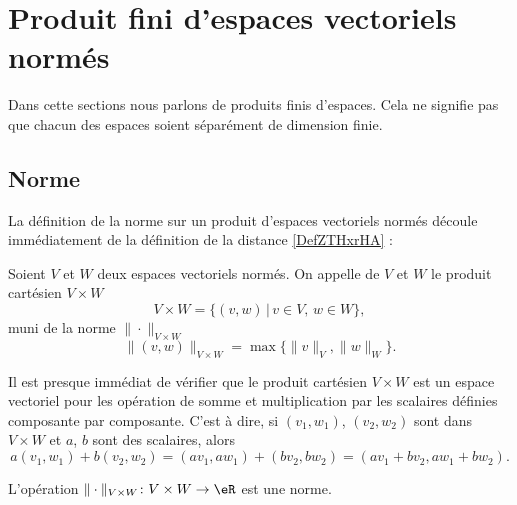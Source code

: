 \section{Produit fini d'espaces vectoriels normés}\label{sec_prod}

Dans cette sections nous parlons de produits finis d'espaces. Cela ne signifie pas que chacun des espaces soient séparément de dimension finie.

\subsection{Norme}

La définition de la norme sur un produit d'espaces vectoriels normés découle immédiatement de la définition de la distance \ref{DefZTHxrHA} :
\begin{definition}  \label{DefFAJgTCE}
    Soient $V$ et $W$ deux espaces vectoriels normés. On appelle  de $V$ et $W$ le produit cartésien $V\times W$ 
    \begin{equation}
    V\times W=\{(v,w)\,|\, v\in V,\, w\in W\},
    \end{equation}
    muni de la norme $\|\cdot \|_{V\times W}$
    \begin{equation}	\label{EqNormeVxWmax}
        \|(v,w) \|_{V\times W}=\max\{\|v\|_{V},\|w\|_W\}.
    \end{equation}
\end{definition}
Il est presque immédiat de vérifier que le produit cartésien $V\times W$ est un espace vectoriel pour les opération de somme et multiplication par les scalaires définies composante par composante. C'est à dire,  si $(v_1,w_1)$, $(v_2,w_2)$ sont dans $V\times W$ et $a$, $b$ sont des scalaires, alors  
\begin{equation}
 a (v_1,w_1)+ b(v_2,w_2)=(av_1,aw_1)+ (bv_2,bw_2)=(av_1+bv_2,aw_1+bw_2).
\end{equation}

\begin{lemma}
	L'opération $\|\cdot \|_{V\times W}\colon V\times W\to \eR$ est une norme.
\end{lemma}

